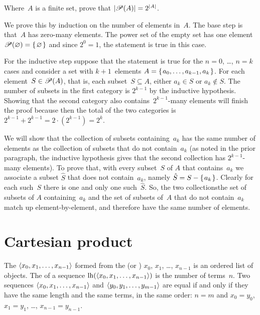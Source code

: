 \documentclass{ibl}  %
\begin{document}
\begin{ex}
Where~$A$ is a finite set, prove that $|\mathscr{P}(A)|=2^{|A|}$.    
\begin{ans}
We prove this by induction on the number of elements in~$A$.
The base step is that~$A$ has zero-many elements.
The power set of the empty set has
one element $\mathscr{P}(\varnothing)=\mbox{$\{\hspace{0.1em}\varnothing\hspace{0.1em}\}$}$ and
since $2^0=1$, the statement is true in this case. 

For the inductive step suppose that the statement is true for the 
$n=0$, \ldots, $n=k$ cases and consider a set
with $k+1$~elements
$A=\mbox{$\{\hspace{0.1em}a_0, \ldots, a_{k-1},a_k\hspace{0.1em}\}$}$.
For each element~$S\in\mathscr{P}(A)$, that is, each subset~$S\subseteq A$,
either $a_k\in S$ or $a_k\notin S$.
The number of subsets in the first category is $2^{k-1}$ by the inductive
hypothesis.
Showing that 
the second category also contains~$2^{k-1}$-many elements will finish the proof
because then
the total of the two categories is 
$2^{k-1}+2^{k-1}=2\cdot(2^{k-1})=2^k$.

We will show that the collection of subsets containing~$a_k$
has the same number of elements as the collection of subsets that do not
contain~$a_k$
(as noted in the prior paragraph, the inductive hypothesis gives that
the second collection has $2^{k-1}$-many elements).
To prove that, with every subset~$S$ of $A$ that contains~$a_k$ we associate
a subset $\hat{S}$ that does not contain~$a_k$,
namely $\hat{S}=S-\mbox{$\{\hspace{0.1em}a_k\hspace{0.1em}\}$}$.
Clearly for each such~$S$ there is one and only one such~$\hat{S}$.
So, the two collections\Dash the set of subsets of $A$ containing~$a_k$
and the set of subsets of~$A$ that do not contain~$a_k$\Dash match
up element-by-element, and therefore have the same number of elements.
\end{ans}
\end{ex}





\section{Cartesian product}

\begin{df}
The  $\langle x_0, x_1, \ldots, x_{n-1}\rangle$
formed from the  
(or ) $x_0$, $x_1$, \ldots, $x_{n-1}$ 
is an ordered list of objects.
The  of a sequence $\operatorname*{lh}(\langle x_0, x_1, \ldots, x_{n-1}\rangle)$
is the number of terms~$n$.
Two sequences $\langle x_0, x_1, \ldots, x_{n-1}\rangle$ and
$\langle y_0, y_1, \ldots, y_{m-1}\rangle$ are equal if and only if
they have the same length and
the same terms, in the same order:
$n=m$ and
$x_0=y_0$, $x_1=y_1$, \ldots, $x_{n-1}=y_{n-1}$. 
\end{df}
\end{document}
